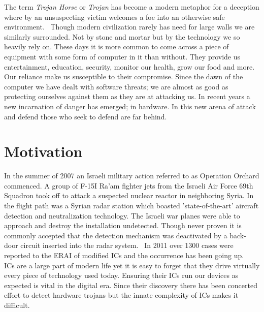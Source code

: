 \label{chapter:introduction}
The term \textit{Trojan Horse} or \textit{Trojan} has become a modern metaphor for a deception where by an unsuspecting victim welcomes a foe into an otherwise safe environment.~\cite{searchForTrojanWar}
Though modern civilization rarely has need for large walls we are similarly surrounded.
Not by stone and mortar but by the technology we so heavily rely on.
These days it is more common to come across a piece of equipment with some form of computer in it than without.
They provide us entertainment, education, security, monitor our health, grow our food and more.
Our reliance make us susceptible to their compromise.
Since the dawn of the computer we have dealt with software threats; we are almost as good as protecting ourselves against them as they are at attacking us.
In recent years a new incarnation of danger has emerged; in hardware.
In this new arena of attack and defend those who seek to defend are far behind.

\section{Motivation}
In the summer of 2007 an Israeli military action referred to as Operation Orchard commenced.
A group of F-15I Ra'am fighter jets from the Israeli Air Force 69th Squadron took off to attack a suspected nuclear reactor in neighboring Syria.
In the flight path was a Syrian radar station which boasted 'state-of-the-art' aircraft detection and neutralization technology. 
The Israeli war planes were able to approach and destroy the installation undetected.
Though never proven it is commonly accepted that the detection mechanism was deactivated by a back-door circuit inserted into the radar system.~\cite{stoppingHTsIEEESpectrum}
In 2011 over 1300 cases were reported to the \acrfull{ERAI} of modified \acrshort{IC}s and the occurrence has been going up.~\cite{counterfeitIEEESpectrum}
\acrfull{ICs} are a large part of modern life yet it is easy to forget that they drive virtually every piece of technology used today.
Ensuring their \acrshort{IC}s run our devices as expected is vital in the digital era.
Since their discovery there has been concerted effort to detect hardware trojans but the innate complexity of \acrshort{IC}s makes it difficult.~\cite{hardwareTrojanSurvey2015}

